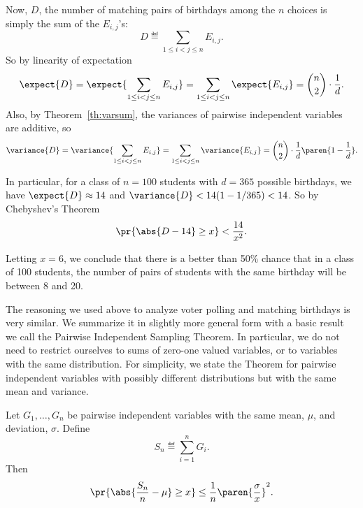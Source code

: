 Now, $D$, the number of matching pairs of birthdays among the $n$
choices is simply the sum of the $E_{i,j}$'s:
\begin{equation}\label{Vn}
D \eqdef \sum_{1\le i < j \le n} E_{i,j}.
\end{equation}
So by linearity of expectation
\[
\expect{D} = \expect{\sum_{1\le i < j \le n} E_{i,j}} = 
               \sum_{1\le i < j \le n} \expect{E_{i,j}} =
               \binom{n}{2}\cdot \frac{1}{d}.
\]
Also, by Theorem~\ref{th:varsum}, the variances of pairwise independent
variables are additive, so
\[
\variance{D} = \variance{\sum_{1\le i < j \le n} E_{i,j}} = 
               \sum_{1\le i < j \le n} \variance{E_{i,j}} =
               \binom{n}{2} \cdot \frac{1}{d}\paren{1-\frac{1}{d}}.
\]

In particular, for a class of $n= 100$ students with $d=365$ possible
birthdays, we have $\expect{D} \approx 14$ and $\variance{D} < 14 (1-
1/365) < 14$.  So by Chebyshev's Theorem
\[
\pr{\abs{D - 14} \geq x} < \frac{14}{x^2}.
\]

Letting $x=6$, we conclude that there is a better than 50\% chance that in
a class of 100 students, the number of pairs of students with the same
birthday will be between 8 and 20.  

The reasoning we used above to analyze voter polling and matching
birthdays is very similar.  We summarize it in slightly more general form
with a basic result we call the Pairwise Independent Sampling Theorem.  In
particular, we do not need to restrict ourselves to sums of zero-one
valued variables, or to variables with the same distribution.  For
simplicity, we state the Theorem for pairwise independent variables with
possibly different distributions but with the same mean and variance.

\begin{theorem*}
Let $G_1, \dots, G_n$ be pairwise independent variables with the same
mean, $\mu$, and deviation, $\sigma$.  Define
\begin{equation}\label{ln14.Sn}
S_n \eqdef \sum_{i=1}^n G_i.
\end{equation}
Then
\[
\pr{\abs{\frac{S_n}{n} - \mu} \geq x}
    \leq \frac{1}{n} \paren{\frac{\sigma}{x}}^2.
\]
\end{theorem*}

